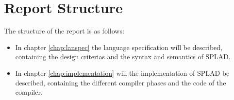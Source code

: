 \section{Report Structure}
The structure of the report is as follows:
\begin{itemize}
	\item In chapter \ref{chap:lanspec} the language specification will be described, containing the design criterias and the syntax and semantics of SPLAD.
	\item In chapter \ref{chap:implementation} will the implementation of SPLAD be described, containing the different compiler phases and the code of the compiler.
\end{itemize}
